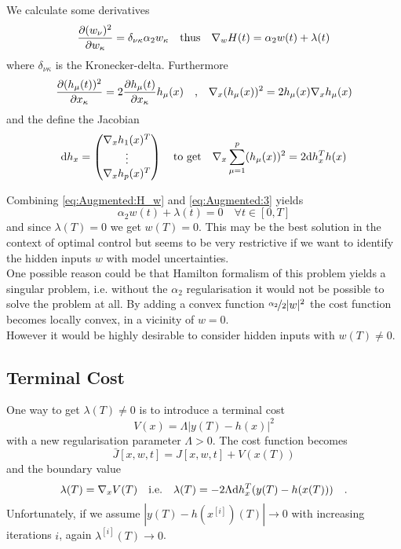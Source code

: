 We calculate some derivatives
\begin{equation}
\frac{\partial (w_\nu )^2}{\partial w_\kappa} =\delta_{\nu\kappa} \alpha_2 w_\kappa
\quad \text{thus} \quad \nabla_w H(t) = \alpha_2 w(t) +\lambda(t)
\label{eq:Augmented:H_w}
\end{equation}
where $\delta_{\nu\kappa}$ is the Kronecker-delta. Furthermore
\begin{equation}
\frac{\partial (h_\mu(t) )^2}{\partial x_\kappa}= 2 \frac{\partial h_\mu(t)}{\partial x_\kappa} 
h_\mu(x) \quad \text{,} \quad \nabla_x (h_\mu(x))^2 = 2 h_\mu(x) \nabla_x h_\mu(x) 
\end{equation}
and the define the Jacobian
\begin{equation}
\text{d} h_x = \begin{pmatrix}
\nabla_x h_1(x)^T \\ \vdots \\ \nabla_x h_p(x)^T 
\end{pmatrix}
\quad \text{to get} \quad
\nabla_x \sum\limits_{\mu=1}^p (h_\mu(x))^2 = 2 \text{d} h_x^T h(x)
\end{equation}

Combining \eqref{eq:Augmented:H_w} and \eqref{eq:Augmented:3} yields 
\begin{equation}
\alpha_2 w(t) + \lambda(t) = 0 \quad \forall t\in[0,T] \label{eq:wlambda}
\end{equation}
and since $\lambda(T)=0$ we get $w(T)=0$. This may be the best solution in the context 
of optimal control but seems to be very restrictive if we want to identify the hidden 
inputs $w$ with model uncertainties.\\

One possible reason could be that Hamilton formalism of this problem yields a singular 
problem, i.e. without the $\alpha_2$ regularisation it would not be possible to solve 
the problem at all. By adding a convex function $\nicefrac{\alpha_2}{2}|w|^2$ 
the cost function becomes locally convex, in a vicinity of $w=0$. \\

However it would be highly desirable to consider hidden inputs with $w(T)\neq 0$.

\subsection{Terminal Cost}
	One way to get $\lambda(T)\neq 0$ is to introduce a terminal cost
	\begin{equation}
	V(x) =\Lambda \left|y(T) - h(x) \right|^2
	\end{equation}
	with a new regularisation parameter $\Lambda>0$.
	The cost function becomes
	\begin{equation}
	\bar{J}[x,w,t] = J[x,w,t] + V(x(T))
	\end{equation}
	and the boundary value
	\begin{equation}
	\lambda(T) = \nabla_x V (T)
	\quad \text{i.e.} \quad
	\lambda(T) = - 2 \Lambda \text{d} h^T_x (y(T)-h(x(T))) 	
	 \quad .
	\end{equation}
	Unfortunately, if we assume $|y(T)-h\left(x^{[i]}\right)(T)| \rightarrow 0$ with increasing 
	iterations $i$, again 
	$\lambda^{[i]}(T) \rightarrow 0$.

